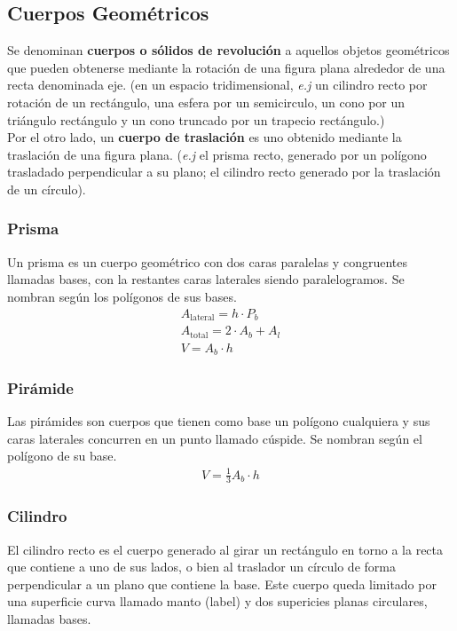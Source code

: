 \subsection{Cuerpos Geométricos}
Se denominan \textbf{cuerpos o sólidos de revolución} a aquellos objetos geométricos que pueden obtenerse mediante la rotación de una figura plana alrededor de una recta denominada eje. (en un espacio tridimensional, \textit{e.j} un cilindro recto por rotación de un rectángulo, una esfera por un semicirculo, un cono por un triángulo rectángulo y un cono truncado por un trapecio rectángulo.)\\

Por el otro lado, un \textbf{cuerpo de traslación} es uno obtenido mediante la traslación de una figura plana. (\textit{e.j} el prisma recto, generado por un polígono trasladado perpendicular a su plano; el cilindro recto generado por la traslación de un círculo).
\subsubsection{Prisma}
Un prisma es un cuerpo geométrico con dos caras paralelas y congruentes llamadas bases, con la restantes caras laterales siendo paralelogramos. Se nombran según los polígonos de sus bases. \\
\begin{gather*}
    A_{\text{lateral}} = h \cdot P_b\\
    A_{\text{total}} = 2\cdot A_b + A_l\\
    V = A_b\cdot h
\end{gather*}
\subsubsection{Pirámide}
Las pirámides son cuerpos que tienen como base un polígono cualquiera y sus caras laterales concurren en un punto llamado cúspide. Se nombran según el polígono de su base.\\
\begin{equation*}
    \begin{aligned} 
    V = \frac{1}{3}A_b\cdot h
    \end{aligned}
\end{equation*}
\subsubsection{Cilindro}
El cilindro recto es el cuerpo generado al girar un rectángulo en torno a la recta que contiene a uno de sus lados, o bien al traslador un círculo de forma perpendicular a un plano que contiene la base. Este cuerpo queda limitado por una superficie curva llamado manto (label) y dos supericies planas circulares, llamadas bases.

